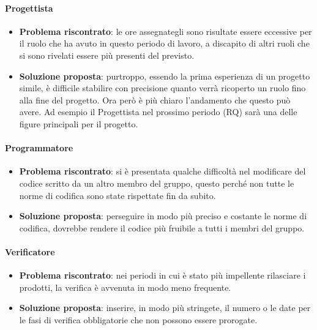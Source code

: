         \paragraph{Progettista}
            \begin{itemize}
                \item \textbf{Problema riscontrato}: le ore assegnategli sono risultate essere eccessive per il ruolo che ha avuto in questo periodo di lavoro, a discapito di altri ruoli che si sono rivelati essere più presenti del previsto.
                \item \textbf{Soluzione proposta}: purtroppo, essendo la prima esperienza di un progetto simile, è difficile stabilire con precisione quanto verrà ricoperto un ruolo fino alla fine del progetto. Ora però è più chiaro l'andamento che questo può avere. Ad esempio il Progettista nel prossimo periodo (RQ) sarà una delle figure principali per il progetto.
            \end{itemize}
        
        \paragraph{Programmatore}
            \begin{itemize}
                \item \textbf{Problema riscontrato}: si è presentata qualche difficoltà nel modificare del codice scritto da un altro membro del gruppo, questo perché non tutte le norme di codifica sono state rispettate fin da subito.
                \item \textbf{Soluzione proposta}: perseguire in modo più preciso e costante le norme di codifica, dovrebbe rendere il codice più fruibile a tutti i membri del gruppo.
            \end{itemize}
        
        \paragraph{Verificatore}
            \begin{itemize}
                \item \textbf{Problema riscontrato}: nei periodi in cui è stato più impellente rilasciare i prodotti, la verifica è avvenuta in modo meno frequente.
                \item \textbf{Soluzione proposta}: inserire, in modo più stringete, il numero o le date per le fasi di verifica obbligatorie che non possono essere prorogate.
            \end{itemize}
    
